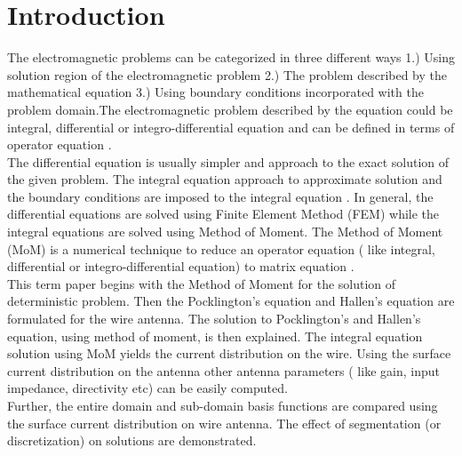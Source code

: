 \documentclass[aps,prstab,twocolumn,superscriptaddress,groupedaddress,showkeys,nofootinbib]{revtex4}  %
\begin{document}
\section{Introduction}
The electromagnetic  problems can be categorized in three different ways 1.) Using solution region of the electromagnetic problem 2.) The problem described by the mathematical equation 3.) Using boundary conditions incorporated with the problem domain\cite{sadiku}.The electromagnetic problem described by the equation could be integral, differential or integro-differential equation and can be defined in terms of operator equation \cite{sadiku}.\\
The differential equation is usually simpler and approach to the exact solution of the given problem. The integral equation approach to approximate solution and the boundary conditions are imposed to the integral equation \cite{garg}. In general, the differential equations are solved using Finite Element Method (FEM) while the integral equations are solved using Method of Moment. The Method of Moment (MoM) is a numerical technique to reduce an operator equation ( like integral, differential or integro-differential equation) to matrix equation \cite{harri}.\\
This term paper begins with the Method of Moment for the solution of deterministic problem. Then the Pocklington's equation and Hallen's equation are formulated for the wire antenna. The solution to Pocklington's and Hallen's equation, using method of moment, is then explained. The integral equation solution using MoM yields the current distribution on the wire. Using the surface current distribution on the antenna other antenna parameters ( like gain, input impedance, directivity etc) can be easily computed.\\
Further, the entire domain and sub-domain basis functions are compared using the surface current distribution on wire antenna. The effect of  segmentation (or discretization) on solutions are demonstrated.
\end{document}
